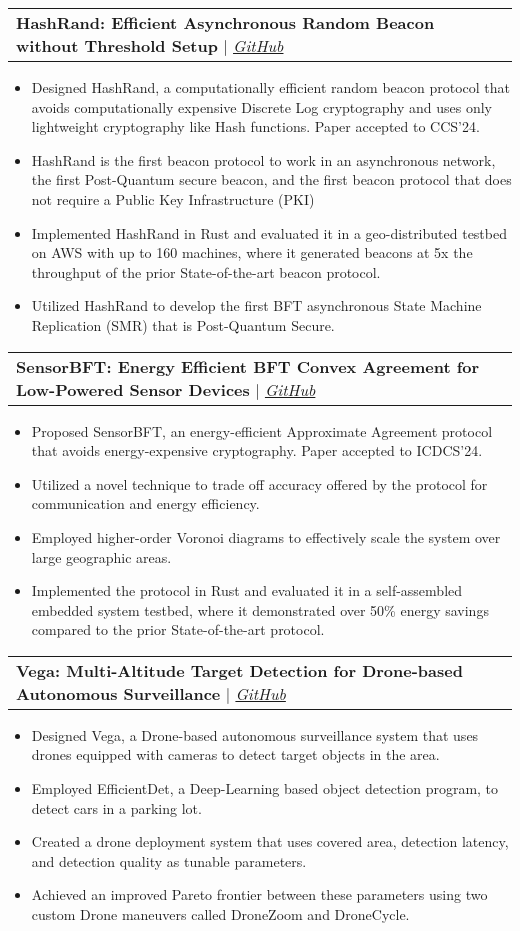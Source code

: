 \documentclass[letterpaper,11pt]{article}
\makeatletter
\newcommand{\resumeItem}[1]{
  \item\small{
    {#1}
  }
}
\newcommand{\resumeProjectHeading}[2]{
    \vspace{-2pt}\item
    \begin{tabular*}{0.97\textwidth}{l@{\extracolsep{\fill}}r}
      \small#1 & #2 \\
    \end{tabular*}\vspace{-7pt}
}
\newcommand{\resumeItemListStart}{\begin{itemize}}
\newcommand{\resumeItemListEnd}{\end{itemize}\vspace{-5pt}}
\makeatother
\begin{document}
      \resumeProjectHeading
        {\textbf{HashRand: Efficient Asynchronous Random Beacon without Threshold Setup} $|$ \emph{\href{https://github.com/akhilsb/hashrand-rs}{\color{blue}GitHub}}}{}
          \resumeItemListStart
            \resumeItem{Designed HashRand, a computationally efficient random beacon protocol that avoids computationally expensive Discrete Log cryptography and uses only lightweight cryptography like Hash functions. Paper accepted to CCS’24.}
            \resumeItem{HashRand is the first beacon protocol to work in an asynchronous network, the first Post-Quantum secure beacon, and the first beacon protocol that does not require a Public Key Infrastructure (PKI)}
            \resumeItem{Implemented HashRand in Rust and evaluated it in a geo-distributed testbed on AWS with up to 160 machines, where it generated beacons at 5x the throughput of the prior State-of-the-art beacon protocol.}
            \resumeItem{Utilized HashRand to develop the first BFT asynchronous State Machine Replication (SMR) that is Post-Quantum Secure. }
          \resumeItemListEnd
      
      \resumeProjectHeading
        {\textbf{SensorBFT: Energy Efficient BFT Convex Agreement for Low-Powered Sensor Devices} $|$ \emph{\href{https://github.com/akhilsb/sensorbft-rs}{\color{blue}GitHub}}}{}
          \resumeItemListStart
            \resumeItem{Proposed SensorBFT, an energy-efficient Approximate Agreement protocol that avoids energy-expensive cryptography. Paper accepted to ICDCS’24.}
            \resumeItem{Utilized a novel technique to trade off accuracy offered by the protocol for communication and energy efficiency.}
            \resumeItem{Employed higher-order Voronoi diagrams to effectively scale the system over large geographic areas.}
            \resumeItem{Implemented the protocol in Rust and evaluated it in a self-assembled embedded system testbed, where it demonstrated over 50\% energy savings compared to the prior State-of-the-art protocol.}
          \resumeItemListEnd
      
      
     \resumeProjectHeading
      {\textbf{Vega: Multi-Altitude Target Detection for Drone-based Autonomous Surveillance} $|$ \emph{\href{https://github.com/icanforce/Vega-Multi-Alt-Detection-2023}{\color{blue}GitHub}}}{}
      \resumeItemListStart
      \resumeItem{Designed Vega, a Drone-based autonomous surveillance system that uses drones equipped with cameras to detect target objects in the area.}
      \resumeItem{Employed EfficientDet, a Deep-Learning based object detection program, to detect cars in a parking lot.}
      \resumeItem{Created a drone deployment system that uses covered area, detection latency, and detection quality as tunable parameters.}
      \resumeItem{Achieved an improved Pareto frontier between these parameters using two custom Drone maneuvers called DroneZoom and DroneCycle.}
      \resumeItemListEnd
	
\end{document}
